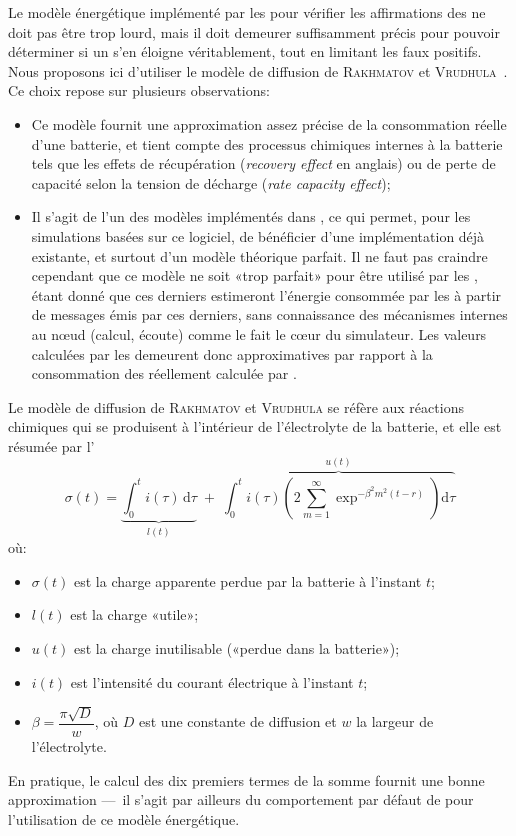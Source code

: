 Le modèle énergétique implémenté par les \vns pour vérifier les affirmations des \cns ne doit pas être trop lourd, mais il doit demeurer suffisamment précis pour pouvoir déterminer si un \cn s'en éloigne véritablement, tout en limitant les faux positifs.
Nous proposons ici d'utiliser le modèle de diffusion de \textsc{Rakhmatov} et \textsc{Vrudhula}~\cite{RV01}.\label{se:rakvru-formula}
Ce choix repose sur plusieurs observations:
\begin{itemize}
    \item Ce modèle fournit une approximation assez précise de la consommation réelle d'une batterie, et tient compte des processus chimiques internes à la batterie tels que les effets de récupération (\textit{recovery effect} en anglais) ou de perte de capacité selon la tension de décharge (\textit{rate capacity effect});
    \item Il s'agit de l'un des modèles implémentés dans \nsiii, ce qui permet, pour les simulations basées sur ce logiciel, de bénéficier d'une implémentation déjà existante, et surtout d'un modèle théorique parfait. Il ne faut pas craindre cependant que ce modèle ne soit «trop parfait» pour être utilisé par les \vns, étant donné que ces derniers estimeront l'énergie consommée par les \cns à partir de messages émis par ces derniers, sans connaissance des mécanismes internes au nœud (calcul, écoute) comme le fait le cœur du simulateur. Les valeurs calculées par les \vns demeurent donc approximatives par rapport à la consommation des \cns réellement calculée par \nsiii.
\end{itemize}
Le modèle de diffusion de \textsc{Rakhmatov} et \textsc{Vrudhula} se réfère aux réactions chimiques qui se produisent à l'intérieur de l'électrolyte de la batterie, et elle est résumée par l'
\begin{equation}
    \label{se:eqn:rvdm}
    \sigma(t) = \underbrace{\int_{0}^{t} i(\tau) \, \mathrm d\tau}_{l(t)} \;+\; \overbrace{\int_{0}^{t} i(\tau) \left(2 \sum_{m=1}^{\infty} \exp^{-\beta^2 m^2 (t-r)} \right) \mathrm d\tau}^{u(t)}
\end{equation}
où:
\begin{itemize}
    \item $\sigma(t)$ est la charge apparente perdue par la batterie à l'instant $t$;
    \item $l(t)$ est la charge «utile»;
    \item $u(t)$ est la charge inutilisable («perdue dans la batterie»);
    \item $i(t)$ est l'intensité du courant électrique à l'instant $t$;
    \item $\beta = \dfrac{\pi\sqrt{D}}{w}$, où $D$ est une constante de diffusion et $w$ la largeur de l'électrolyte.
\end{itemize}
En pratique, le calcul des dix premiers termes de la somme fournit une bonne approximation ---~il s'agit par ailleurs du comportement par défaut de \nsiii pour l'utilisation de ce modèle énergétique.

